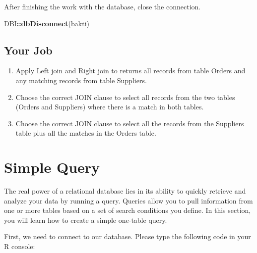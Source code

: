\documentclass[
]{book}
\newenvironment{Shaded}{\begin{snugshade}}{\end{snugshade}}
\newcommand{\FunctionTok}[1]{\textcolor[rgb]{0.13,0.29,0.53}{\textbf{#1}}}
\newcommand{\NormalTok}[1]{#1}
\newcommand{\SpecialCharTok}[1]{\textcolor[rgb]{0.81,0.36,0.00}{\textbf{#1}}}
\begin{document}
After finishing the work with the database, close the connection.

\begin{Shaded}
\begin{Highlighting}[]
\NormalTok{DBI}\SpecialCharTok{::}\FunctionTok{dbDisconnect}\NormalTok{(bakti)}
\end{Highlighting}
\end{Shaded}

\hypertarget{your-job-2}{%
\section{Your Job}\label{your-job-2}}

\begin{enumerate}
\def\labelenumi{\arabic{enumi}.}
\item
  Apply Left join and Right join to returns all records from table Orders and any matching records from table Suppliers.
\item
  Choose the correct JOIN clause to select all records from the two tables (Orders and Suppliers) where there is a match in both tables.
\item
  Choose the correct JOIN clause to select all the records from the Suppliers table plus all the matches in the Orders table.
\end{enumerate}

\hypertarget{simple-query}{%
\chapter{Simple Query}\label{simple-query}}

The real power of a relational database lies in its ability to quickly retrieve and analyze your data by running a query. Queries allow you to pull information from one or more tables based on a set of search conditions you define. In this section, you will learn how to create a simple one-table query.

First, we need to connect to our database. Please type the following code in your R console:
\end{document}

